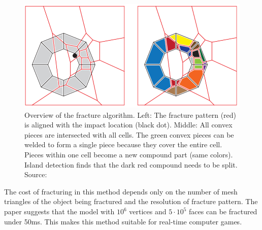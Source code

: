 \begin{figure}
\centering
        \includegraphics[width=\textwidth]{img/vacdAlgorithm}
        \caption{Overview of the fracture algorithm. Left: The fracture pattern (red) is aligned with the impact location (black dot). Middle: All
convex pieces are intersected with all cells. The green convex pieces can be welded to form a single piece because they cover the entire
cell. Pieces within one cell become a new compound part (same colors). Island detection finds that the dark red compound needs to be split. Source: \citet{nvidia}}
        \label{fig:vacdalg}
\end{figure}

The cost of fracturing in this method depends only on the number of mesh triangles of the object being fractured and the resolution of fracture pattern. The paper suggests that the model with $10^6$ vertices and $5\cdot10^5$ faces can be fractured under 50ms. This makes this method suitable for real-time computer games.


